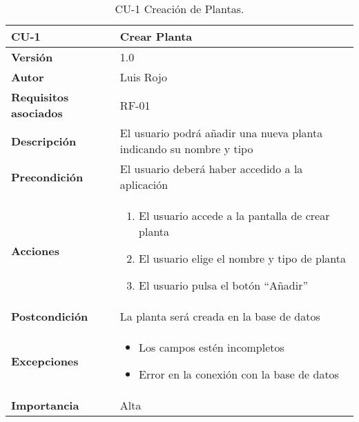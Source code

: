 \begin{table}[p]
	\centering
	\begin{tabularx}{\linewidth}{ p{} p{} }
		\toprule
		\textbf{CU-1}    & \textbf{Crear Planta}\\
		\toprule
		\textbf{Versión}              & 1.0    \\
		\textbf{Autor}                & Luis Rojo \\
		\textbf{Requisitos asociados} & RF-01 \\
		\textbf{Descripción}          & El usuario podrá añadir una nueva planta indicando su nombre y tipo \\
		\textbf{Precondición}         &  El usuario deberá haber accedido a la aplicación \\
		\textbf{Acciones}             &
		\begin{enumerate}
			\def\labelenumi{\arabic{enumi}.}
			\tightlist
			\item El usuario accede a la pantalla de crear planta
			\item El usuario elige el nombre y tipo de planta
                \item El usuario pulsa el botón ``Añadir''
		\end{enumerate}\\
		\textbf{Postcondición}        & La planta será creada en la base de datos \\
		\textbf{Excepciones}          & 
            \begin{itemize}
                \item Los campos estén incompletos
                \item Error en la conexión con la base de datos
            \end{itemize}\\
		\textbf{Importancia}          & Alta  \\
		\bottomrule
	\end{tabularx}
	\caption{CU-1 Creación de Plantas.}
\end{table}


